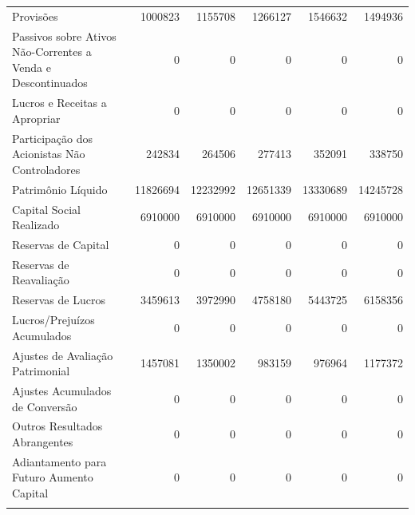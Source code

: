 \documentclass[grad,numbers]{coppe}
\begin{document}
\begin{longtable}[t]{>{\raggedright\arraybackslash}p{6cm}rrrrr}
  Provisões & 1000823 & 1155708 & 1266127 & 1546632 & 1494936\\
  Passivos sobre Ativos Não-Correntes a Venda e Descontinuados & 0 & 0 & 0 & 0 & 0\\
  Lucros e Receitas a Apropriar & 0 & 0 & 0 & 0 & 0\\
  Participação dos Acionistas Não Controladores & 242834 & 264506 & 277413 & 352091 & 338750\\
  \addlinespace
  Patrimônio Líquido & 11826694 & 12232992 & 12651339 & 13330689 & 14245728\\
  Capital Social Realizado & 6910000 & 6910000 & 6910000 & 6910000 & 6910000\\
  Reservas de Capital & 0 & 0 & 0 & 0 & 0\\
  Reservas de Reavaliação & 0 & 0 & 0 & 0 & 0\\
  Reservas de Lucros & 3459613 & 3972990 & 4758180 & 5443725 & 6158356\\
  \addlinespace
  Lucros/Prejuízos Acumulados & 0 & 0 & 0 & 0 & 0\\
  Ajustes de Avaliação Patrimonial & 1457081 & 1350002 & 983159 & 976964 & 1177372\\
  Ajustes Acumulados de Conversão & 0 & 0 & 0 & 0 & 0\\
  Outros Resultados Abrangentes & 0 & 0 & 0 & 0 & 0\\
  Adiantamento para Futuro Aumento Capital & 0 & 0 & 0 & 0 & 0\\*
  \end{longtable}
  \endgroup{}
\end{document}
